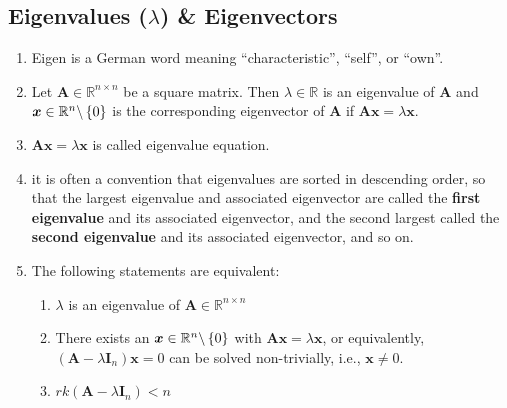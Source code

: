 \subsection{Eigenvalues ($\lambda$) \& Eigenvectors}

\begin{enumerate}
    \item Eigen is a German word meaning “characteristic”, “self”, or “own”.
    \hfill \cite{mfml/book/mml/Deisenroth-Faisal-Ong}

    \item 
    \begin{definition}
        Let $\bm{A} \in \mathbb{R}^{n\times n}$ be a square matrix. 
        Then $\lambda \in \mathbb{R}$ is an eigenvalue of $\bm{A}$ and $\bm{x} \in \mathbb{R}^n\backslash\left\{0\right\}$ is the corresponding eigenvector of $\bm{A}$ if
        $\bm{Ax} = \lambda \bm{x}$.
        \hfill \cite{mfml/book/mml/Deisenroth-Faisal-Ong}
    \end{definition}

    \item $\bm{Ax} = \lambda \bm{x}$ is called eigenvalue equation.
    \hfill \cite{mfml/book/mml/Deisenroth-Faisal-Ong}

    \item it is often a convention that eigenvalues are sorted in descending order, so that the largest eigenvalue and associated eigenvector are called the \textbf{first eigenvalue} and its associated eigenvector, and the second largest called the \textbf{second eigenvalue} and its associated eigenvector, and so on.
    \hfill \cite{mfml/book/mml/Deisenroth-Faisal-Ong}

    \item The following statements are equivalent:
    \begin{enumerate}
        \item $\lambda$ is an eigenvalue of $\bm{A} \in \mathbb{R}^{n\times n}$
        \hfill \cite{mfml/book/mml/Deisenroth-Faisal-Ong}

        \item There exists an $\bm{x} \in \mathbb{R}^n\backslash\left\{0\right\}$ with $\bm{Ax} = \lambda \bm{x}$, or equivalently, $(\bm{A} - \lambda \bm{I}_n)\bm{x} = 0$ can be solved non-trivially, i.e., $\bm{x} \neq 0$.
        \hfill \cite{mfml/book/mml/Deisenroth-Faisal-Ong}

        \item $rk(\bm{A} - \lambda \bm{I}_n) < n$
        \hfill \cite{mfml/book/mml/Deisenroth-Faisal-Ong}


\end{enumerate}
\end{enumerate}
